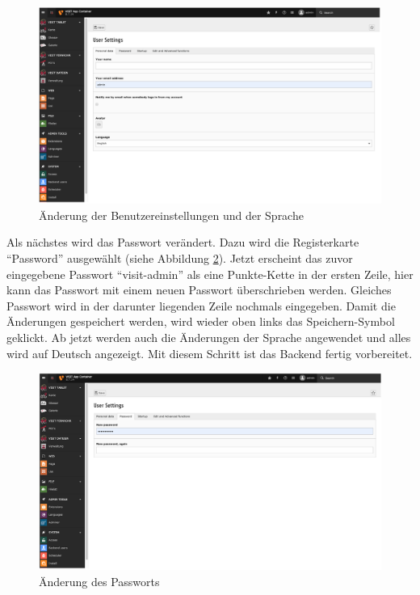 \begin{figure}[ht!]
\centering
\includegraphics[width=12cm]{Figures/paula/typo3/benutzereinstellungen_sprache.png}
\caption{Änderung der Benutzereinstellungen und der Sprache}
\label{img:benutzereinstellungen_sprache}
\end{figure}

Als nächstes wird das Passwort verändert. Dazu wird die Registerkarte “Password” ausgewählt (siehe Abbildung \ref{img:aenderung_passwort}). Jetzt erscheint das zuvor eingegebene Passwort “visit-admin” als eine Punkte-Kette in der ersten Zeile, hier kann das Passwort mit einem neuen Passwort überschrieben werden. Gleiches Passwort wird in der darunter liegenden Zeile nochmals eingegeben. Damit die Änderungen gespeichert werden, wird wieder oben links das Speichern-Symbol geklickt. Ab jetzt werden auch die Änderungen der Sprache angewendet und alles wird auf Deutsch angezeigt. Mit diesem Schritt ist das Backend fertig vorbereitet.

\begin{figure}[ht!]
\centering
\includegraphics[width=12cm]{Figures/paula/typo3/aenderung_passwort.png}
\caption{Änderung des Passworts}
\label{img:aenderung_passwort}
\end{figure}

